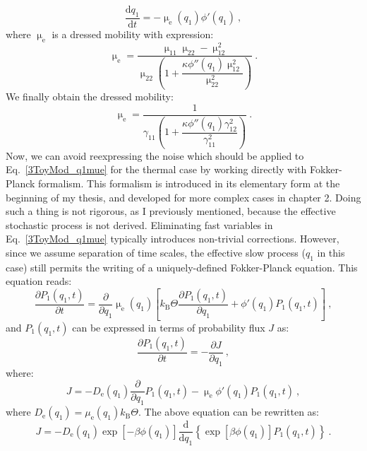 \begin{equation}
    \dfrac{\mathrm{d}q_1}{\mathrm{d}t} = -\upmu_\mathrm{e}(q_1)\phi'(q_1)~,
    \label{3ToyMod_q1mue}
\end{equation}
where $\upmu_\mathrm{e}$ is a dressed mobility with expression:
\begin{equation}
    \upmu_\mathrm{e} = \dfrac{\upmu_{11}\upmu_{22} - \upmu_{12}^2}{\upmu_{22}\left( 1 + \dfrac{ \kappa \phi''(q_1) \upmu_{12}^2}{\upmu_{22}^2}\right)}~.
\end{equation}
We finally obtain the dressed mobility:
\begin{equation}
    \upmu_\mathrm{e} = \dfrac{1}{\gamma_{11}\left( 1 + \dfrac{ \kappa \phi''(q_1) \gamma_{12}^2}{\gamma_{11}^2}\right)}~.
\end{equation}
Now, we can avoid reexpressing the noise which should be applied to Eq.~\ref{3ToyMod_q1mue} for the thermal case by working directly with Fokker-Planck formalism. This formalism is introduced in its elementary form at the beginning of my thesis, and developed for more complex cases in chapter 2. Doing such a thing is not rigorous, as I previously mentioned, because the effective stochastic process is not derived. Eliminating fast variables in Eq.~\ref{3ToyMod_q1mue} typically introduces non-trivial corrections. However, since we assume separation of time scales, the effective slow process ($q_1$ in this case) still permits the writing of a uniquely-defined Fokker-Planck equation. This equation reads:
\begin{equation}
    \dfrac{\partial P_1 (q_1, t)}{\partial t} = \dfrac{\partial}{\partial q_1} \upmu_\mathrm{e}(q_1) \left[ k_\mathrm{B}\Theta \dfrac{\partial P_1 (q_1, t)}{\partial q_1} + \phi'(q_1)P_1(q_1, t)\right]~,
\end{equation}
and $P_1(q_1, t)$ can be expressed in terms of probability flux $J$ as:
\begin{equation}
    \dfrac{\partial P_1(q_1, t)}{\partial t} = -\dfrac{\partial J}{\partial q_1}~,
\end{equation}
where:
\begin{equation}
    J = -D_\mathrm{e}(q_1) \dfrac{\partial}{\partial q_1} P_1(q_1, t) - \upmu_\mathrm{e} \phi'(q_1) P_1(q_1, t)~,
\end{equation}
where $D_\mathrm{e}(q_1) = \mu_\mathrm{e}(q_1)k_\mathrm{B}\Theta$. The above equation can be rewritten as:
\begin{equation}
    J = - D_\mathrm{e}(q_1)\exp\left[-\beta \phi(q_1)\right] \dfrac{\mathrm{d}}{\mathrm{d}q_1} \left\{\exp\left[\beta \phi(q_1)\right]P_1 (q_1, t)\right\}~.
    \label{eq:tmcurrent}
\end{equation}
